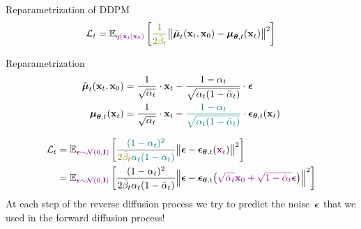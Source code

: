 \begin{frame}{Reparametrization of DDPM}
	\vspace{-0.3cm}
	\[
		\cL_t = \bbE_{\color{violet}q(\bx_t | \bx_0)} \left[ {\color{olive}\frac{1}{2\tilde{\beta}_t}} \bigl\| \tilde{\bmu}_t(\bx_t, \bx_0) - \bmu_{\btheta, t}(\bx_t) \bigr\|^2  \right]
	\]
	\vspace{-0.3cm}
	\begin{block}{Reparametrization}
		\vspace{-0.7cm}
		\begin{align*}
			\tilde{\boldsymbol{\mu}}_t(\mathbf{x}_t, \mathbf{x}_0) &= \frac{1}{\sqrt{\alpha_t}} \cdot \mathbf{x}_t - \frac{1 - \alpha_t}{\sqrt{\alpha_t (1 - \bar{\alpha}_t)}} \cdot \boldsymbol{\epsilon} \\
			\boldsymbol{\mu}_{\boldsymbol{\theta}, t}(\mathbf{x}_t) &= \frac{1}{\sqrt{\alpha_t}} \cdot \mathbf{x}_t - {\color{teal}\frac{1 - \alpha_t}{\sqrt{\alpha_t (1 - \bar{\alpha}_t)}}} \cdot \boldsymbol{\epsilon}_{\boldsymbol{\theta}, t}(\mathbf{x}_t)
		\end{align*}
		\vspace{-0.7cm}
	\end{block}
		\vspace{-0.5cm}
		\begin{align*}
			\cL_t &=  \bbE_{\color{violet} \bepsilon \sim \cN(0, \bI)} \left[ \frac{{\color{teal}(1 - \alpha_t)^2}}{{\color{olive}2\tilde{\beta}_t} {\color{teal} \alpha_t (1 - \bar{\alpha}_t)}} \bigl\| \bepsilon - \bepsilon_{\btheta, t}({\color{violet}\bx_t}) \bigr\|^2 \right] \\
			& =	 \bbE_{\color{violet}\bepsilon \sim \cN(0, \bI)} \left[ \frac{(1 - \alpha_t)^2}{2\tilde{\beta}_t \alpha_t (1 - \bar{\alpha}_t)} \Bigl\| \bepsilon - \bepsilon_{\btheta, t}\bigl( {\color{violet}\sqrt{\bar{\alpha}_t} \bx_0 + \sqrt{1 - \bar{\alpha}_t} \bepsilon}\bigr) \Bigr\|^2 \right]
		\end{align*}
		At each step of the reverse diffusion process we try to predict the noise~$\boldsymbol{\epsilon}$ that we used in the forward diffusion process!
	\end{frame}
